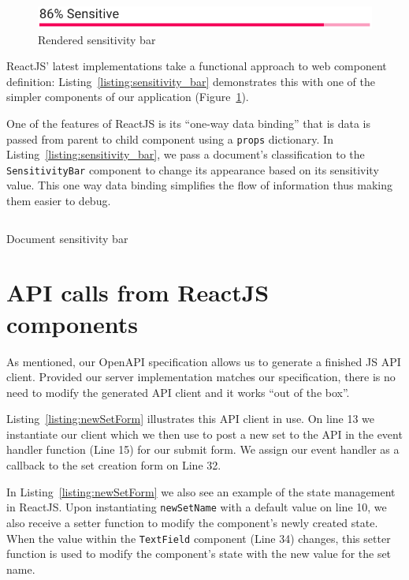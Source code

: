 \documentclass[\version]{l4proj}
\begin{document}
\begin{figure}
    \includegraphics[width=\linewidth]{figures/sensitivity_bar.pdf}
    \caption{Rendered sensitivity bar}\label{fig:sensitivity_bar_preview}
    \vspace{-10pt}
\end{figure}

ReactJS' latest implementations take a functional approach to web component definition: Listing~\ref{listing:sensitivity_bar} demonstrates this with one of the simpler components of our application (Figure~\ref{fig:sensitivity_bar_preview}).

One of the features of ReactJS is its ``one-way data binding'' that is data is passed from parent to child component using a \verb|props| dictionary.
In Listing~\ref{listing:sensitivity_bar}, we pass a document's classification to the \verb|SensitivityBar| component to change its appearance based on its sensitivity value.
This one way data binding simplifies the flow of information thus making them easier to debug.


\begin{listing}[H]
    \inputminted{jsx}{code/documentSensitivityBar.jsx}
    \caption{Document sensitivity bar}\label{listing:sensitivity_bar}
\end{listing}

\section{API calls from ReactJS components}

As mentioned, our OpenAPI specification allows us to generate a finished JS API client.
Provided our server implementation matches our specification, there is no need to modify the generated API client and it works ``out of the box''.

Listing~\ref{listing:newSetForm} illustrates this API client in use.
On line 13 we instantiate our client which we then use to post a new set to the API in the event handler function (Line 15) for our submit form.
We assign our event handler as a callback to the set creation form on Line 32.

In Listing~\ref{listing:newSetForm} we also see an example of the state management in ReactJS.
Upon instantiating \verb|newSetName| with a default value on line 10, we also receive a setter function to modify the component's newly created state.
When the value within the \verb|TextField| component (Line 34) changes, this setter function is used to modify the component's state with the new value for the set name.
\end{document}
